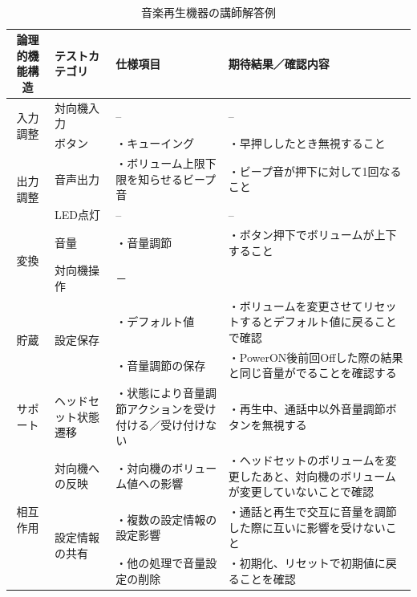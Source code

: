 \begin{table}[htbp]
　\footnotesize
  \centering
  \caption{音楽再生機器の講師解答例}
    \begin{tabular}{|c|l|p{11em}|p{11em}|}
    \hline
    \multicolumn{1}{|p{7em}|}{{論理的機能構造}} & \multicolumn{1}{p{8em}|}{{テストカテゴリ}} & {仕様項目} & {期待結果／確認内容} \bigstrut\\
    \hline
    \hline
    \multicolumn{1}{|c|}{\multirow{2}[4]{*}{{入力調整}}} & \multicolumn{1}{p{7.75em}|}{{対向機入力}} & {--} & {--} \bigstrut\\
\cline{2-4}          & \multicolumn{1}{p{7.75em}|}{{ボタン}} & {・キューイング} & {・早押ししたとき無視すること} \bigstrut\\
    \hline
    \multicolumn{1}{|c|}{\multirow{2}[4]{*}{{出力調整}}} & \multicolumn{1}{p{7.75em}|}{{音声出力}} & {・ボリューム上限下限を知らせるビープ音} & {・ビープ音が押下に対して1回なること} \bigstrut\\
\cline{2-4}          & \multicolumn{1}{p{7.75em}|}{{LED点灯}} & {--} & {--} \bigstrut\\
    \hline
    \multicolumn{1}{|c|}{\multirow{2}[4]{*}{{変換}}} & \multicolumn{1}{p{7.75em}|}{{音量}} & {・音量調節} & {・ボタン押下でボリュームが上下すること} \bigstrut\\
\cline{2-4}          & \multicolumn{1}{p{7.75em}|}{{対向機操作}} & {－} & \multicolumn{1}{r|}{} \bigstrut\\
    \hline
    \multicolumn{1}{|c|}{\multirow{2}[2]{*}{{貯蔵}}} & \multicolumn{1}{l|}{\multirow{2}[2]{*}{{設定保存}}} & {・デフォルト値} & {・ボリュームを変更させてリセットするとデフォルト値に戻ることで確認} \bigstrut[t]\\
          &       & {・音量調節の保存} & {・PowerON後前回Offした際の結果と同じ音量がでることを確認する} \bigstrut[b]\\
    \hline
    \multicolumn{1}{|p{5.835em}|}{{サポート}} & \multicolumn{1}{p{7.75em}|}{{ヘッドセット状態遷移}} & {・状態により音量調節アクションを受け付ける／受け付けない} & {・再生中、通話中以外音量調節ボタンを無視する} \bigstrut\\
    \hline
    \multicolumn{1}{|c|}{\multirow{3}[4]{*}{{相互作用}}} & \multicolumn{1}{p{7.75em}|}{{対向機への反映}} & {・対向機のボリューム値への影響} & {・ヘッドセットのボリュームを変更したあと、対向機のボリュームが変更していないことで確認} \bigstrut\\
\cline{2-4}          & \multicolumn{1}{l|}{\multirow{2}[2]{*}{{設定情報の共有}}} & {・複数の設定情報の設定影響} & {・通話と再生で交互に音量を調節した際に互いに影響を受けないこと} \bigstrut[t]\\
          &       & {・他の処理で音量設定の削除} & {・初期化、リセットで初期値に戻ることを確認} \bigstrut[b]\\
    \hline
    \end{tabular}%
  \label{tab:D-3-ensyu1}%
\end{table}%



